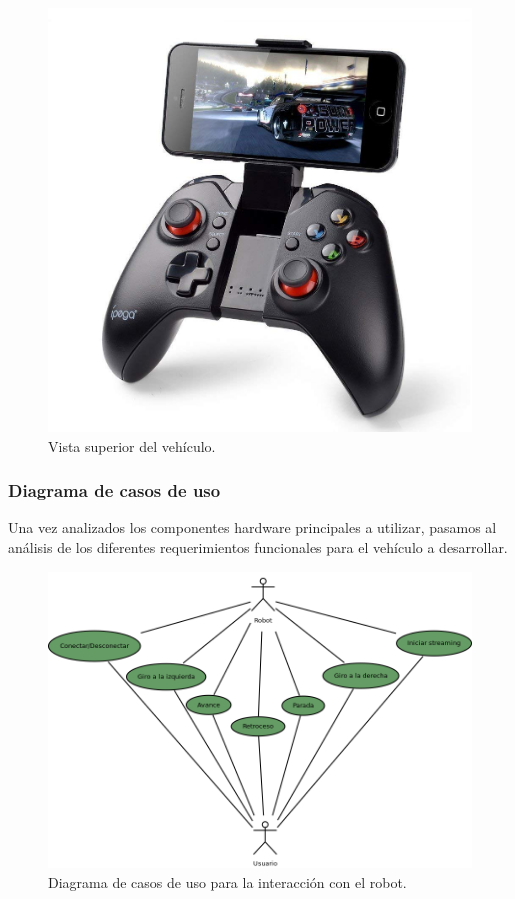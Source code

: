 \begin{figure}[H]
  \begin{center}
    \includegraphics[scale=0.2]{imagenes/robot/control_pad.jpg}
  \end{center}
  \caption{Vista superior del vehículo.}
  \label{figura:rpi-modulo-bateria}
\end{figure}


\subsubsection{Diagrama de casos de uso}

Una vez analizados los componentes hardware principales a utilizar, pasamos al análisis de los diferentes requerimientos funcionales para el vehículo a desarrollar.

\begin{figure}[H]
  \begin{center}
    \includegraphics[scale=.5]{diagramas/casos-uso-robot.png}
  \end{center}
  \caption{Diagrama de casos de uso para la interacción con el robot.}
  \label{diagram:caso-uso}
\end{figure}

